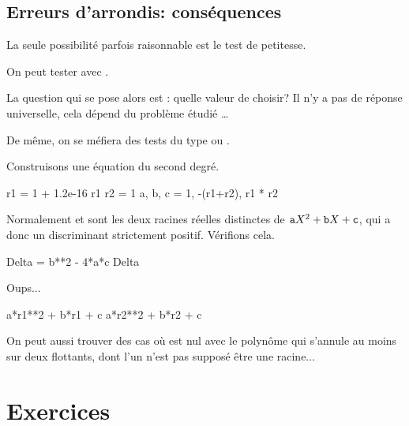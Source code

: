 \subsection{Erreurs d'arrondis: conséquences}


\vspace{0.5cm}

 La seule possibilité parfois raisonnable est  le \og test de petitesse\fg.
\begin{exemple}
  On peut tester  avec .
\end{exemple}

 La question qui se pose alors est : quelle valeur de  choisir? Il n'y a pas de réponse universelle,  cela dépend du problème étudié \ldots{}


De même, on se méfiera des tests du type  ou .


\begin{exemple}
  
\end{exemple}
 Construisons une équation du second degré.

\begin{pyconsole}
r1 = 1 + 1.2e-16
r1
r2 = 1
a, b, c = 1, -(r1+r2), r1 * r2
\end{pyconsole}
Normalement  et  sont les deux racines réelles distinctes de
$\text{\texttt{a}}X^2+\text{\texttt{b}}X+\text{\texttt{c}}$, qui a donc un discriminant strictement positif.
Vérifions cela.
\begin{pyconsole}
Delta = b**2 - 4*a*c
Delta
\end{pyconsole}
Oups...
\begin{pyconsole}
a*r1**2 + b*r1 + c
a*r2**2 + b*r2 + c
\end{pyconsole}

On peut aussi trouver des cas où  est nul avec le polynôme
qui s'annule au moins sur deux flottants, dont l'un n'est pas supposé
être une racine...

\section{Exercices}

